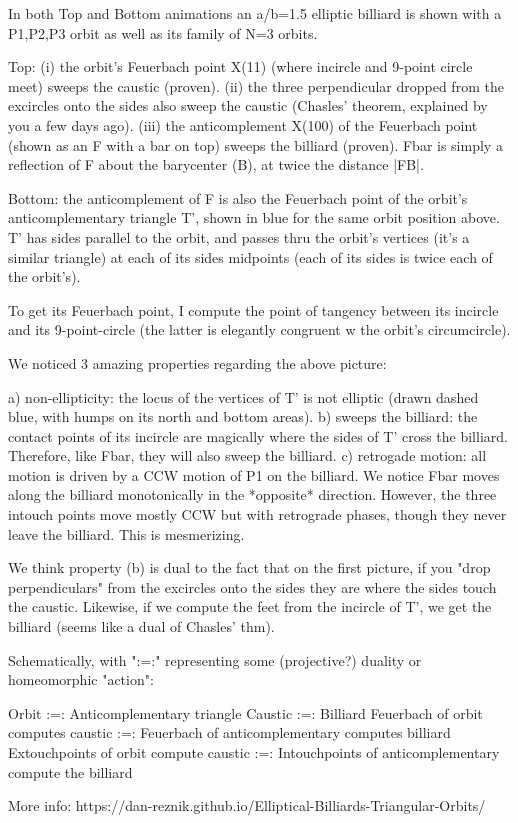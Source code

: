 In both Top and Bottom animations an a/b=1.5 elliptic billiard is shown with a P1,P2,P3 orbit as well as its family of N=3 orbits.

Top: (i) the orbit's Feuerbach point X(11) (where incircle and 9-point circle meet) sweeps the caustic (proven). (ii) the three perpendicular dropped from the excircles onto the sides also sweep the caustic (Chasles' theorem, explained by you a few days ago). (iii) the anticomplement X(100) of the Feuerbach point (shown as an F with a bar on top) sweeps the billiard (proven). Fbar is simply a reflection of F about the barycenter (B), at twice the distance |FB|.

Bottom: the anticomplement of F is also the Feuerbach point of the orbit's anticomplementary triangle T', shown in blue for the same orbit position above. T' has sides parallel to the orbit, and passes thru the orbit's vertices (it's a similar triangle) at each of its sides midpoints (each of its sides is twice each of the orbit's).

To get its Feuerbach point, I compute the point of tangency between its incircle and its 9-point-circle (the latter is elegantly congruent w the orbit's circumcircle).

We noticed 3 amazing properties regarding the above picture:

a) non-ellipticity: the locus of the vertices of T' is not elliptic (drawn dashed blue, with humps on its north and bottom areas).
b) sweeps the billiard: the contact points of its incircle are magically where the sides of T' cross the billiard. Therefore, like Fbar, they will also sweep the billiard.
c) retrogade motion: all motion is driven by a CCW motion of P1 on the billiard. We notice Fbar moves along the billiard monotonically in the *opposite* direction. However, the three intouch points move mostly CCW but with retrograde phases, though they never leave the billiard. This is mesmerizing.

We think property (b) is dual to the fact that on the first picture, if you "drop perpendiculars" from the excircles onto the sides they are where the sides touch the caustic. Likewise, if we compute the feet from the incircle of T', we get the billiard (seems like a dual of Chasles' thm).

Schematically, with ":=:" representing some (projective?) duality or homeomorphic "action":

Orbit :=: Anticomplementary triangle
Caustic :=: Billiard  
Feuerbach of orbit computes caustic :=: Feuerbach of anticomplementary computes billiard
Extouchpoints of orbit compute caustic :=: Intouchpoints of anticomplementary compute the billiard

More info: https://dan-reznik.github.io/Elliptical-Billiards-Triangular-Orbits/